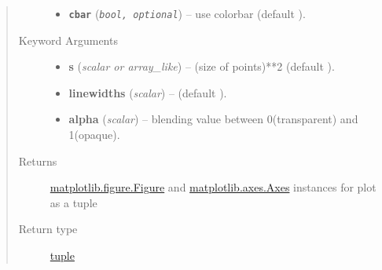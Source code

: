 \documentclass[letterpaper,10pt,english]{sphinxhowto}
\begin{document}
\begin{fulllineitems}
\begin{quote}
\begin{description}
\begin{itemize}
\item {} 
\textbf{\texttt{cbar}} (\emph{\texttt{bool, optional}}) -- use colorbar (default ).

\end{itemize}

\item[{Keyword Arguments}] \leavevmode\begin{itemize}
\item {} 
\textbf{s} (\emph{scalar or array\_like}) --
(size of points)**2 (default ).

\item {} 
\textbf{linewidths} (\emph{scalar}) --
(default ).

\item {} 
\textbf{alpha} (\emph{scalar}) --
blending value between 0(transparent) and 1(opaque).

\end{itemize}

\item[{Returns}] \leavevmode
\href{http://matplotlib.org/api/figure\_api.html\#matplotlib.figure.Figure}{matplotlib.figure.Figure} and \href{http://matplotlib.org/api/axes\_api.html\#matplotlib.axes.Axes}{matplotlib.axes.Axes}
instances for plot as a tuple

\item[{Return type}] \leavevmode
\href{https://docs.python.org/library/functions.html\#tuple}{tuple}

\end{description}\end{quote}

\end{fulllineitems}

\end{document}
